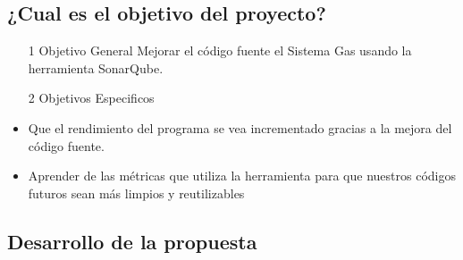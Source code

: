 \documentclass[twoside,twocolumn]{article}
\begin{document}
\subsection{¿Cual es el objetivo del proyecto?}
\begin{itemize}
\item[1] Objetivo General 
\newline
Mejorar el código fuente el Sistema Gas usando la herramienta SonarQube.  
\newline
\newline
\item[2] Objetivos Especificos 
\newline
\item Que el rendimiento del programa se vea incrementado gracias a la mejora del código fuente. 
\newline
\item Aprender de las métricas que utiliza la herramienta para que nuestros códigos futuros sean más limpios y reutilizables 
\end{itemize}
\subsection{Desarrollo de la propuesta}
\end{document}
